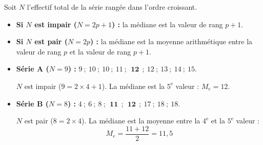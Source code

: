 \begin{methode}
	Soit $N$ l'effectif total de la série rangée dans l'ordre croissant.
	\begin{itemize}
		\item \textbf{Si $N$ est impair ($N = 2p + 1$) :} la médiane est la valeur de rang $p + 1$.
		\item \textbf{Si $N$ est pair ($N = 2p$) :} la médiane est la moyenne arithmétique entre la valeur de rang $p$ et la valeur de rang $p + 1$.
	\end{itemize}

	\begin{correction}
		\nline
		\begin{itemize}
			\item \textbf{Série A ($N = 9$) :} $9 \ ; \ 10 \ ; \ 10 \ ; \ 11 \ ; \ \boxed{~\mathbf{12}~} \ ; \ 12 \ ; \ 13 \ ; \ 14 \ ; \ 15$.

			      $N$ est impair ($9 = 2 \times 4 + 1$). La médiane est la $5^{\text{e}}$ valeur : $M_e = 12$.
			\item \textbf{Série B ($N = 8$) :} $4 \ ; \ 6 \ ; \ 8 \ ; \ \boxed{~\mathbf{11}~} \ ; \ \boxed{~\mathbf{12}~} \ ; \ 17 \ ; \ 18 \ ; \ 18$.

			      $N$ est pair ($8 = 2 \times 4$). La médiane est la moyenne entre la $4^{\text{e}}$ et la $5^{\text{e}}$ valeur :
			      \[
				      M_e = \dfrac{11 + 12}{2} = 11{,}5
			      \]
		\end{itemize}
	\end{correction}
\end{methode}

\newpage

